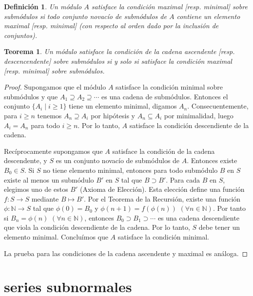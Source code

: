 \documentclass{report}
\newcommand{\naturalNumbers}{\mathbb{N}}
\newtheorem{theorem}{Teorema}
\newtheorem{definition}{Definición}
\begin{document}
  \begin{definition}
    Un módulo \(A\) satisface la \emph{condición maximal} [resp. \emph{minimal}] \emph{sobre submódulos} si todo conjunto novacío de submódulos de \(A\) contiene un elemento maximal [resp. minimal] (con respecto al orden dado por la inclusión de conjuntos).
  \end{definition}

  \begin{theorem}
    \label{theorem:equivalenceOfChainConditions}
    Un módulo satisface la condición de la cadena ascendente [resp. descencendente] sobre submódulos si y solo si satisface la condición maximal [resp. minimal] sobre submódulos.
  \end{theorem}
  \begin{proof}
    Supongamos que el módulo \(A\) satisface la condición minimal sobre submódulos y que \(A_1 \supseteq A_2 \supseteq \cdots\) es una cadena de submódulos.
    Entonces el conjunto \(\{A_i \mid i \geq 1\}\) tiene un elemento minimal, digamos \(A_n\).
    Consecuentemente, para \(i \geq n\) tenemos \(A_n \supseteq A_i\) por hipótesis y \(A_n \subseteq A_i\) por minimalidad, luego \(A_i = A_n\) para todo \(i \geq n\).
    Por lo tanto, \(A\) satisface la condición descendiente de la cadena.

    Recíprocamente supongamos que \(A\) satisface la condición de la cadena descendente, y \(S\) es un conjunto novacío de submódulos de \(A\).
    Entonces existe \(B_0 \in S\).
    Si \(S\) no tiene elemento minimal, entonces para todo submódulo \(B\) en \(S\) existe al menos un submódulo \(B'\) en \(S\) tal que \(B \supset B'\).
    Para cada \(B\) en \(S\), elegimos uno de estos \(B'\) (Axioma de Elección).
    Esta elección define una función \(f : S \rightarrow S\) mediante \(B \mapsto B'\).
    Por el Teorema de la Recursión, existe una función \(\phi : \naturalNumbers \rightarrow S\) tal que \(\phi(0) = B_0\) y \(\phi(n + 1) = f(\phi(n))\) \((\forall n \in \naturalNumbers)\).
    Por tanto si \(B_n = \phi(n)\) \((\forall n \in \naturalNumbers)\), entonces \(B_0 \supset B_1 \supset \cdots\) es una cadena descendiente que viola la condición descendiente de la cadena.
    Por lo tanto, \(S\) debe tener un elemento minimal.
    Concluímos que \(A\) satisface la condición minimal.

    La prueba para las condiciones de la cadena ascendente y maximal es análoga.
  \end{proof}

  \section{series subnormales}
  
\end{document}
